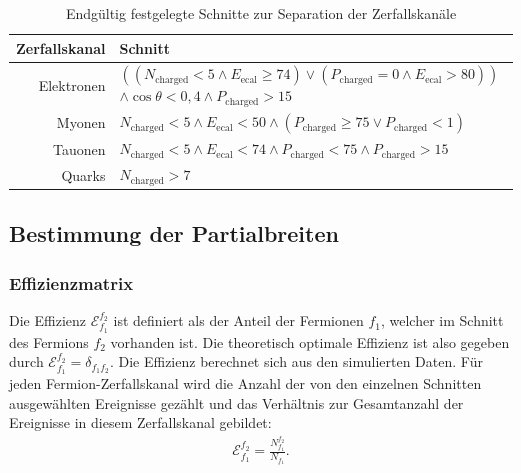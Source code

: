 \begin{table}
	\centering
	\begin{tabular}{r|p{11 cm}}
		\textbf{Zerfallskanal}&\textbf{Schnitt}\\\hline
		Elektronen&$\left(\left(N_\text{charged}<5 \land E_\text{ecal}\geq74\right) \lor \left(P_\text{charged}=0\land E_\text{ecal}>80\right)\right)$\newline$\land\cos\theta<0,4\land P_\text{charged}>15$\\
		Myonen&$N_\text{charged}<5 \land E_\text{ecal}<50 \land \left(P_\text{charged}\geq 75 \lor P_\text{charged}<1\right)$\\
		Tauonen&$N_\text{charged}<5 \land E_\text{ecal}<74 \land P_\text{charged}< 75\land P_\text{charged}>15$\\
		Quarks&$N_\text{charged}>7$\\
	\end{tabular}
	\caption{Endgültig festgelegte Schnitte zur Separation der Zerfallskanäle}
	\label{tab:finalcuts}
\end{table}

\subsection{Bestimmung der Partialbreiten}

\subsubsection{Effizienzmatrix}

Die Effizienz $\mathcal{E}_{f_1}^{f_2}$ ist definiert als der Anteil der Fermionen $f_1$, welcher im Schnitt des Fermions $f_2$ vorhanden ist. Die theoretisch optimale Effizienz ist also gegeben durch $\mathcal{E}_{f_1}^{f_2}=\delta_{f_1f_2}$. Die Effizienz berechnet sich aus den simulierten Daten. Für jeden Fermion-Zerfallskanal wird die Anzahl der von den einzelnen Schnitten ausgewählten Ereignisse gezählt und das Verhältnis zur Gesamtanzahl der Ereignisse in diesem Zerfallskanal gebildet: 
\begin{align}
	\mathcal{E}_{f_1}^{f_2}=\frac{N_{f_1}^{f_2}}{N_{f_1}}\text{.}
\end{align}


